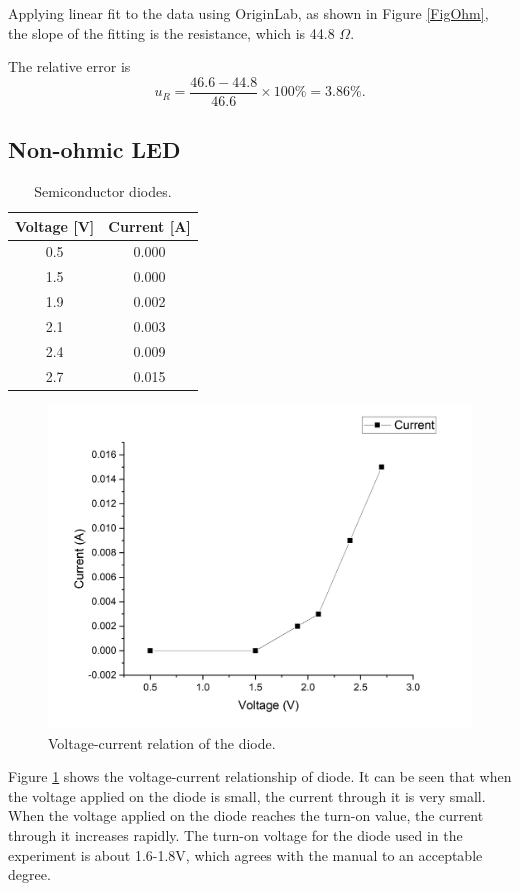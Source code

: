\documentclass{article}
\begin{document}
Applying linear fit to the data using OriginLab, as shown in Figure \ref{FigOhm}, the slope of the fitting is the resistance, which is 44.8 $\Omega$.

The relative error is
$$u_R = \frac{46.6-44.8}{46.6}\times 100\% = 3.86\%.$$


	\subsection{Non-ohmic LED}
\begin{table}[H]\centering
\begin{tabular}{cc}
\toprule
Voltage [V] & Current [A]\\
\midrule
0.5 & 0.000\\
1.5 & 0.000\\
1.9 & 0.002\\
2.1 & 0.003\\
2.4 & 0.009\\
2.7 & 0.015\\
\bottomrule
\end{tabular}
\caption{Semiconductor diodes.}\label{TableDiode}
\end{table}

\begin{figure}[H]\centering
\includegraphics[scale=0.3]{Diode_measured.png}
\caption{Voltage-current relation of the diode.}\label{FigDiode}
\end{figure}

Figure \ref{FigDiode} shows the voltage-current relationship of diode. It can be seen that when the voltage applied on the diode is small, the current through it is very small. When the voltage applied on the diode reaches the turn-on value, the current through it increases rapidly. The turn-on voltage for the diode used in the experiment is about 1.6-1.8V, which agrees with the manual to an acceptable degree.
\end{document}
